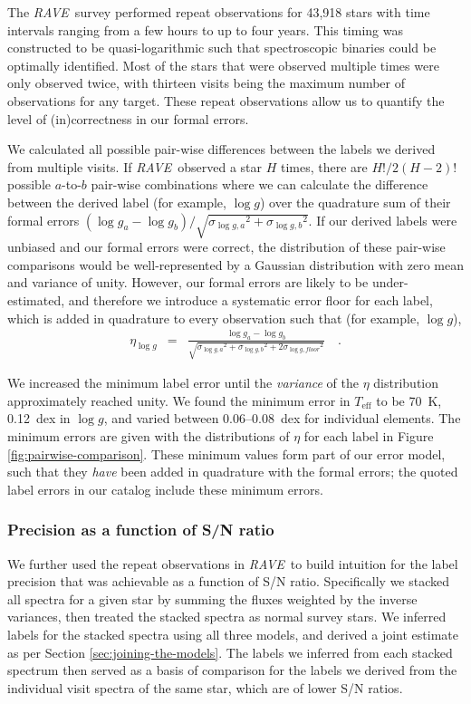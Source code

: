 \documentclass[preprint]{aastex}
\newcommand{\acronym}[1]{{\small{#1}}}
\newcommand{\project}[1]{\textsl{#1}}
\newcommand{\rave}{\project{\acronym{RAVE}}}
\newcommand{\teff}{T_{\mathrm{eff}}}
\newcommand{\logg}{\log g}
\begin{document}
The \rave\ survey performed repeat observations for 43,918 stars with time 
intervals ranging from a few hours to up to four years.  This timing was 
constructed to be quasi-logarithmic such that spectroscopic binaries could
be optimally identified. Most of the stars that were observed multiple times
were only observed twice, with thirteen visits being the maximum number 
of observations for any target.  These repeat observations allow us to 
quantify the level of (in)correctness in our formal errors.  


We calculated all possible pair-wise differences between the labels we
derived from multiple visits.  If \rave\ observed a star $H$ times, there 
are $H!/2(H-2)!$ possible $a$-to-$b$ pair-wise combinations where we can calculate 
the difference between the derived label (for example, $\logg$) over the
quadrature sum of their formal errors $(\logg_a - \logg_b)/\sqrt{{\sigma_{\logg,a}}^2 + {\sigma_{\logg,b}}^2}$.  If our derived labels were unbiased and our formal
errors were correct, the distribution of these pair-wise comparisons would be
well-represented by a Gaussian distribution with zero mean and variance
of unity.  However, our formal errors are likely to be under-estimated,
and therefore we introduce a systematic error floor for each label, which
is added in quadrature to every observation such that (for example, $\logg$),
\begin{eqnarray}
	\eta_{\logg} & = & \frac{\logg_a - \logg_b}{\sqrt{{\sigma_{\logg,a}}^2 + {\sigma_{\logg,b}}^2 + 2{\sigma_{\logg,floor}}^2}} \quad .
\end{eqnarray}


We increased the minimum label error until the \emph{variance} of the $\eta$ 
distribution approximately reached unity.  We found the minimum error in
$\teff$ to be 70~K, 0.12~dex in $\logg$, and varied between 0.06--0.08~dex
for individual elements.  The minimum errors are given with the 
distributions of $\eta$ for each label in Figure \ref{fig:pairwise-comparison}.
These minimum values form part of our error model, such that they \emph{have} 
been added in quadrature with the formal errors; the quoted label errors 
in our catalog include these minimum errors.


\subsubsection{Precision as a function of S/N ratio}
\label{sec:precision-wrt-snr}


We further used the repeat observations in \rave\ to build intuition for
the label precision that was achievable as a function of S/N ratio.  
Specifically we stacked all spectra for a given star by summing the 
fluxes weighted by the inverse variances, then treated the stacked spectra
as normal survey stars.  We inferred labels for the stacked spectra 
using all three models, and derived a joint estimate as per Section 
\ref{sec:joining-the-models}.  The labels we inferred from each stacked 
spectrum then served as a basis of comparison for the labels we derived 
from the individual visit spectra of the same star, which are of lower 
S/N ratios.
\end{document}
